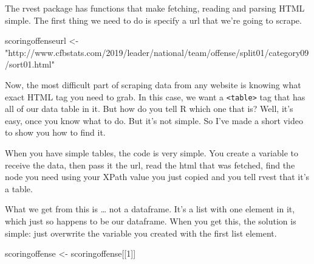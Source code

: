 \documentclass[]{book}
\newenvironment{Shaded}{\begin{snugshade}}{\end{snugshade}}
\newcommand{\DataTypeTok}[1]{\textcolor[rgb]{0.13,0.29,0.53}{#1}}
\newcommand{\DecValTok}[1]{\textcolor[rgb]{0.00,0.00,0.81}{#1}}
\newcommand{\KeywordTok}[1]{\textcolor[rgb]{0.13,0.29,0.53}{\textbf{#1}}}
\newcommand{\NormalTok}[1]{#1}
\newcommand{\OperatorTok}[1]{\textcolor[rgb]{0.81,0.36,0.00}{\textbf{#1}}}
\newcommand{\StringTok}[1]{\textcolor[rgb]{0.31,0.60,0.02}{#1}}
\begin{document}
The rvest package has functions that make fetching, reading and parsing HTML simple. The first thing we need to do is specify a url that we're going to scrape.

\begin{Shaded}
\begin{Highlighting}[]
\NormalTok{scoringoffenseurl <-}\StringTok{ "http://www.cfbstats.com/2019/leader/national/team/offense/split01/category09/sort01.html"}
\end{Highlighting}
\end{Shaded}

Now, the most difficult part of scraping data from any website is knowing what exact HTML tag you need to grab. In this case, we want a \texttt{\textless{}table\textgreater{}} tag that has all of our data table in it. But how do you tell R which one that is? Well, it's easy, once you know what to do. But it's not simple. So I've made a short video to show you how to find it.

When you have simple tables, the code is very simple. You create a variable to receive the data, then pass it the url, read the html that was fetched, find the node you need using your XPath value you just copied and you tell rvest that it's a table.

\begin{Shaded}
\end{Shaded}

What we get from this is \ldots{} not a dataframe. It's a list with one element in it, which just so happens to be our dataframe. When you get this, the solution is simple: just overwrite the variable you created with the first list element.

\begin{Shaded}
\begin{Highlighting}[]
\NormalTok{scoringoffense <-}\StringTok{ }\NormalTok{scoringoffense[[}\DecValTok{1}\NormalTok{]]}
\end{Highlighting}
\end{Shaded}
\end{document}

